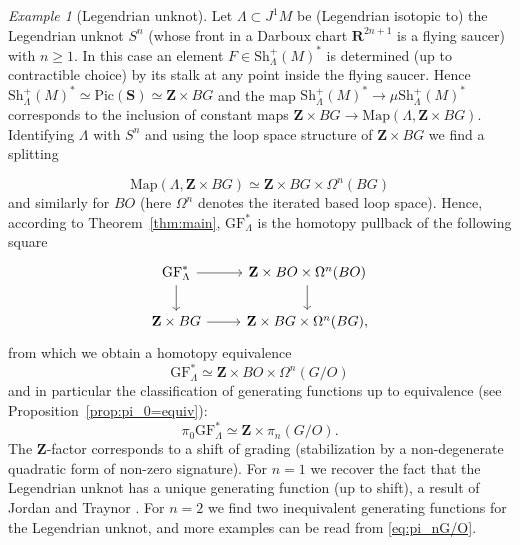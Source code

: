 \documentclass[12pt,a4paper]{article}
\numberwithin{equation}{section}
\theoremstyle{definition}
\theoremstyle{remark}
\newtheorem{example}[equation]{Example}
\newcommand{\Z}{\mathbf{Z}}
\newcommand{\R}{\mathbf{R}}
\newcommand{\Map}{\mathrm{Map}}
\newcommand{\Sh}{\mathrm{Sh}}
\renewcommand{\S}{\mathbf{S}}
\newcommand{\GF}{\mathrm{GF}}
\newcommand{\Pic}{\mathrm{Pic}}
\begin{document}
\begin{example}[Legendrian unknot]
Let $\Lambda\subset J^1 M$ be (Legendrian isotopic to) the Legendrian unknot $S^n$ (whose front in a Darboux chart $\R^{2n+1}$
is a flying saucer) with $n\geq 1$.
In this case an element $F\in\Sh_\Lambda^+(M)^*$ is determined (up to contractible choice) by its stalk at any point inside
the flying saucer. Hence $\Sh_\Lambda^+(M)^* \simeq \Pic(\S)\simeq\Z\times BG$ and the map $\Sh_\Lambda^+(M)^* \to \mu\Sh_\Lambda^+(M)^*$
corresponds to the inclusion of constant maps $\Z\times BG \to \Map(\Lambda,\Z\times BG)$.
Identifying $\Lambda$ with $S^n$ and using the loop space structure of $\Z\times BG$ we find a splitting

\[\Map(\Lambda,\Z\times BG)\simeq \Z\times BG \times \Omega^n (BG)\]
and similarly for $BO$ (here $\Omega^n$ denotes the iterated based loop space). Hence, according to Theorem~\ref{thm:main}, $\GF_\Lambda^*$ is the homotopy pullback of the following square
\begin{equation}
\begin{tikzcd}
\GF_\Lambda^* \arrow[r]\arrow[d]&\Z\times BO \times \Omega^n (BO)\arrow[d]\\
\Z \times BG\arrow[r]& \Z\times BG \times \Omega^n (BG),
\end{tikzcd}
\end{equation}
from which we obtain a homotopy equivalence
\begin{equation}\label{eq:unknot}
\GF_\Lambda^*\simeq \Z\times BO\times \Omega^n (G/O)
\end{equation}
and in particular the classification of generating functions up to equivalence (see Proposition~\ref{prop:pi_0=equiv}):
\[\pi_0\GF_\Lambda^* \simeq \Z\times \pi_n (G/O).\]
The $\Z$-factor corresponds to a shift of grading (stabilization by a non-degenerate quadratic form
of non-zero signature). For $n=1$ we recover the fact that the Legendrian unknot has a unique generating function (up to shift),
a result of Jordan and Traynor \cite{Jordan-Traynor}. For $n=2$ we find two inequivalent generating
functions for the Legendrian unknot, and more examples can be read from \eqref{eq:pi_nG/O}.


\end{example}
\end{document}
